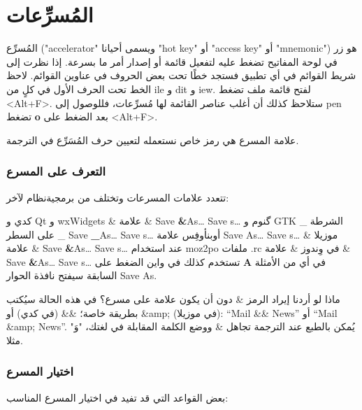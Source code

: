 \section{المُسرِّعات}
المُسرِّع ("accelerator" ويسمى
أحيانا "hot key" أو "access key" أو "mnemonic") هو زر في لوحة المفاتيح
تضغط عليه لتفعيل قائمة أو إصدار أمر ما بسرعة. إذا نظرت إلى شريط القوائم
في أي تطبيق فستجد خطًا تحت بعض الحروف في عناوين القوائم. لاحظ الخط تحت
الحرف الأول في كلٍ من ile و dit و
iew. لفتح قائمة ملف تضغط <Alt+F>. ستلاحظ كذلك أن أغلب عناصر
القائمة لها مُسرِّعات، فللوصول إلى pen تضغط {\bf o} بعد
الضغط على <Alt+F>.

علامة المسرع هي رمز خاص نستعمله لتعيين حرف المُسَرِّع في الترجمة.

\subsubsection{التعرف على المسرع}
تتعدد علامات المسرعات وتختلف من برمجية نظام لآخر:

\starttable[|l|l|l|l|l|l|]
\HL
\NC {} \NC {} \NC
{} \NC {} \NC
{} \NC {}\NC\AR
\HL
\NC كدي و Qt و wxWidgets \NC \&  \NC علامة \& \NC Save {\bf \&}As…  \NC
Save s… \NC \NC\AR
\HL
\NC گنوم و GTK \NC \_  \NC الشرطة على السطر \_ \NC Save {\bf \_}As…  \NC
Save s… \NC \NC\AR
\HL
\NC أوبن​أوفِس \NC {}   \NC علامة   \NC Save {\bf
{} }As…  \NC Save s… \NC \NC\AR
\HL
\NC موزيلا \NC \&  \NC علامة \& \NC Save {\bf \&}As…  \NC Save
s… \NC عند استخدام moz2po \NC\AR
\HL
\NC ملفات .rc في وِندوز  \NC \&  \NC علامة \& \NC Save {\bf \&}As…  \NC
Save s… \NC تستخدم كذلك في واين\NC\AR
\HL
\stoptable
الضغط على {\bf A} في أي من الأمثلة السابقة سيفتح نافذة الحوار Save As.

ماذا لو أردنا إيراد الرمز \& دون أن يكون علامة على مسرع؟ في هذه الحالة
سيُكتب بطريقة خاصة؛ \&\& (في كدي) أو ‪\&amp;‬ (في موزيلا): “Mail \&\&
News” أو “Mail \&amp; News”. يُمكن بالطبع عند الترجمة تجاهل \& ووضع
الكلمة المقابلة في لغتك، "وَ" مثلا.

\subsubsection{اختيار المسرع}
بعض القواعد التي قد تفيد في اختيار المسرع المناسب:


